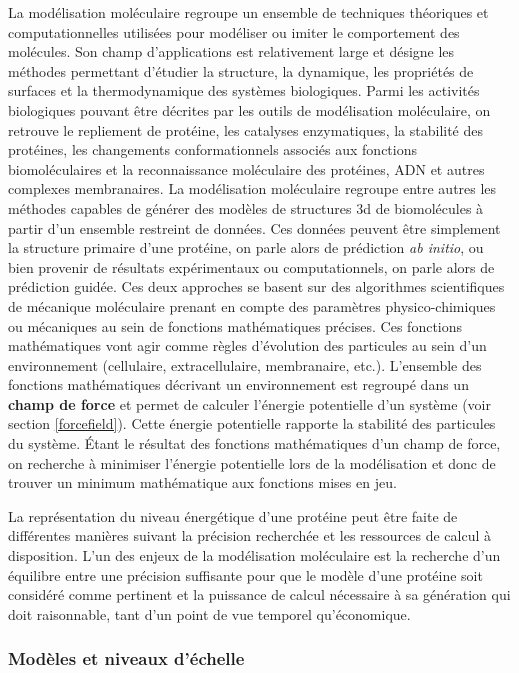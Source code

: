 La modélisation moléculaire regroupe un ensemble de techniques théoriques et computationnelles utilisées pour modéliser ou imiter le comportement des molécules.
Son champ d'applications est relativement large et désigne les méthodes permettant d'étudier la structure, la dynamique, les propriétés de surfaces et la thermodynamique des systèmes biologiques. Parmi les activités biologiques pouvant être décrites par les outils de modélisation moléculaire, on retrouve le repliement de protéine, les catalyses enzymatiques, la stabilité des protéines, les changements conformationnels associés aux fonctions biomoléculaires et la reconnaissance moléculaire des protéines, ADN et autres complexes membranaires.
La modélisation moléculaire regroupe entre autres les méthodes capables de générer des modèles de structures 3d de biomolécules à partir d'un ensemble restreint de données. Ces données peuvent être simplement la structure primaire d'une protéine, on parle alors de prédiction \textit{ab initio}, ou bien provenir de résultats expérimentaux ou computationnels, on parle alors de prédiction guidée. Ces deux approches se basent sur des algorithmes scientifiques de mécanique moléculaire prenant en compte des paramètres physico-chimiques ou mécaniques au sein de fonctions mathématiques précises. Ces fonctions mathématiques vont agir comme règles d'évolution des particules au sein d'un environnement (cellulaire, extracellulaire, membranaire, etc.). L'ensemble des fonctions mathématiques décrivant un environnement est regroupé dans un \textbf{champ de force} et permet de calculer l'énergie potentielle d'un système (voir section \ref{forcefield}). Cette énergie potentielle rapporte la stabilité des particules du système. Étant le résultat des fonctions mathématiques d'un champ de force, on recherche à minimiser l'énergie potentielle lors de la modélisation et donc de trouver un minimum mathématique aux fonctions mises en jeu.

La représentation du niveau énergétique d'une protéine peut être faite de différentes manières suivant la précision recherchée et les ressources de calcul à disposition. L'un des enjeux de la modélisation moléculaire est la recherche d'un équilibre entre une précision suffisante pour que le modèle d'une protéine soit considéré comme pertinent et la puissance de calcul nécessaire à sa génération qui doit raisonnable, tant d'un point de vue temporel qu'économique.

\subsubsection{Modèles et niveaux d'échelle}

